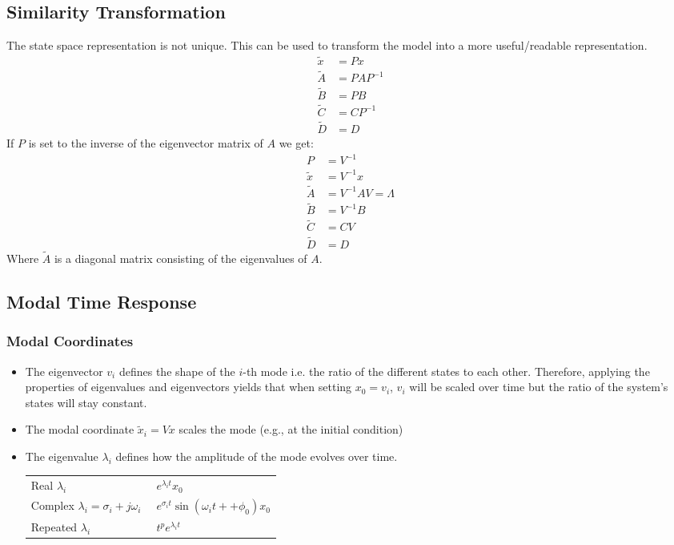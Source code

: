 \subsection{Similarity Transformation}
The state space representation is not unique. This can be used to transform the model into a more \flqq{}useful/readable\frqq{} representation.
\begin{align*}
    \tilde{x} & = Px       \\
    \tilde{A} & = PAP^{-1} \\
    \tilde{B} & = PB       \\
    \tilde{C} & = CP^{-1}  \\
    \tilde{D} & = D
\end{align*}
If $P$ is set to the inverse of the eigenvector matrix of $A$ we get:
\begin{align*}
    P         & = V^{-1}             \\
    \tilde{x} & = V^{-1}x            \\
    \tilde{A} & = V^{-1}AV = \Lambda \\
    \tilde{B} & = V^{-1}B            \\
    \tilde{C} & = CV                 \\
    \tilde{D} & = D
\end{align*}
Where $\tilde{A}$ is a diagonal matrix consisting of the eigenvalues of $A$.

\subsection{Modal Time Response}
\subsubsection{Modal Coordinates}
\begin{itemize}
    \item The eigenvector $v_i$ defines the shape of the $i$-th mode i.e. the ratio of the different states to each other. Therefore, applying the properties of eigenvalues and eigenvectors yields that when setting $x_0=v_i$, $v_i$ will be scaled over time but the ratio of the system's states will stay constant.
    \item The modal coordinate $\tilde{x}_i=Vx$ scales the mode (e.g., at the initial condition)
    \item The eigenvalue $\lambda_i$ defines how the amplitude of the mode evolves over time.

          \begin{tabularx}{\linewidth}{@{}p{0.5\linewidth}X@{}}
              \quad Real $\lambda_i$                            & \textrightarrow{} $e^{\lambda_i t}x_0$                          \\
              \quad Complex $\lambda_i = \sigma_i + j \omega_i$ & \textrightarrow{} $e^{\sigma_i t}\sin(\omega_i t ++ \phi_0)x_0$ \\
              \quad Repeated $\lambda_i$                        & \textrightarrow{} $t^p e^{\lambda_i t}$
          \end{tabularx}
\end{itemize}

